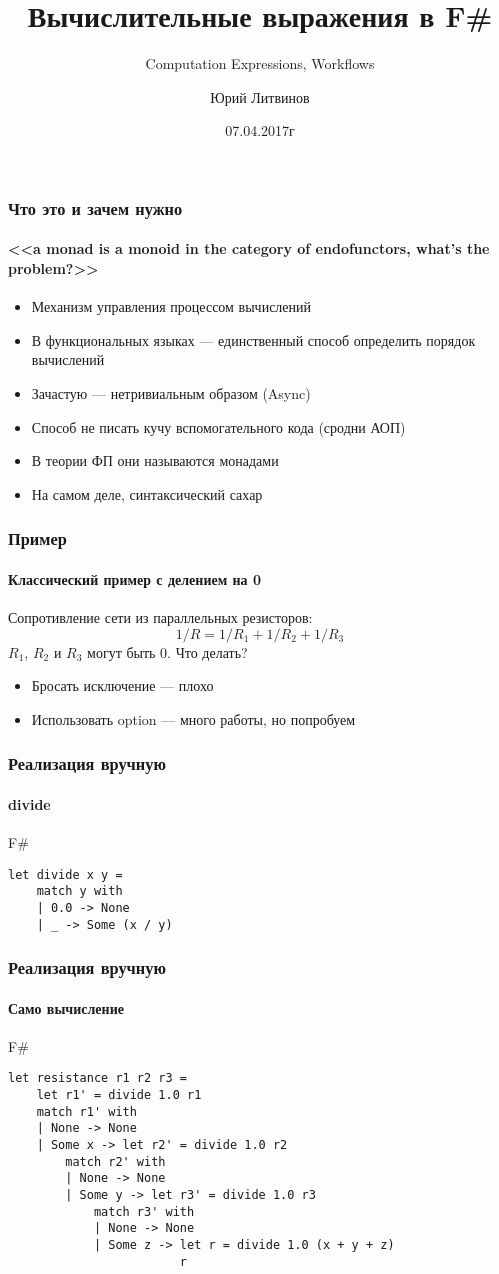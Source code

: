 \documentclass[xetex,mathserif,serif]{beamer}
\title{Вычислительные выражения в F\#}
\subtitle{Computation Expressions, Workflows}
\author{Юрий Литвинов}
\date{07.04.2017г}
\begin{document}
	
	\frame{\titlepage}
	
	\begin{frame}
		\frametitle{Что это и зачем нужно}
		\framesubtitle{<<a monad is a monoid in the category of endofunctors, what's the problem?>>}
		\begin{itemize}
			\item Механизм управления процессом вычислений
			\item В функциональных языках --- единственный способ определить порядок вычислений
			\item Зачастую --- нетривиальным образом (Async)
			\item Способ не писать кучу вспомогательного кода (сродни АОП)
			\item В теории ФП они называются монадами
			\item На самом деле, синтаксический сахар
		\end{itemize}
	\end{frame}	

	\begin{frame}
		\frametitle{Пример}
		\framesubtitle{Классический пример с делением на 0}
		Сопротивление сети из параллельных резисторов:
		$$1/R = 1/R_1 + 1/R_2 + 1/R_3$$
		$R_1$, $R_2$ и $R_3$ могут быть 0. Что делать?
		\begin{itemize}
			\item Бросать исключение --- плохо
			\item Использовать option --- много работы, но попробуем
		\end{itemize}
	\end{frame}	

	\begin{frame}[fragile]
		\frametitle{Реализация вручную}
		\framesubtitle{divide}
		\begin{exampleblock}{F\#}
			\begin{verbatim}
let divide x y =
    match y with
    | 0.0 -> None
    | _ -> Some (x / y)
			\end{verbatim}
		\end{exampleblock}
\end{frame}

	\begin{frame}[fragile]
		\frametitle{Реализация вручную}
		\framesubtitle{Само вычисление}
		\begin{exampleblock}{F\#}
			\begin{verbatim}
let resistance r1 r2 r3 =
    let r1' = divide 1.0 r1
    match r1' with
    | None -> None
    | Some x -> let r2' = divide 1.0 r2
        match r2' with
        | None -> None
        | Some y -> let r3' = divide 1.0 r3
            match r3' with
            | None -> None
            | Some z -> let r = divide 1.0 (x + y + z)
                        r
			\end{verbatim}
		\end{exampleblock}
\end{frame}
\end{document}
